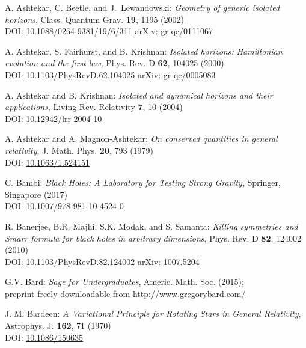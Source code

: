\begin{thebibliography}{123}
A. Ashtekar, C. Beetle, and J.~Lewandowski:
{\em Geometry of generic isolated horizons},
Class. Quantum Grav. {\bf 19}, 1195 (2002)\\
DOI: \href{https://doi.org/10.1088/0264-9381/19/6/311}{10.1088/0264-9381/19/6/311}\hfill
arXiv: \href{https://arxiv.org/abs/gr-qc/0111067}{gr-qc/0111067}

A. Ashtekar, S. Fairhurst, and B. Krishnan:
{\em Isolated horizons: Hamiltonian evolution and the first law},
Phys. Rev. D {\bf 62}, 104025 (2000)\\
DOI: \href{https://doi.org/10.1103/PhysRevD.62.104025}{10.1103/PhysRevD.62.104025}\hfill
arXiv: \href{https://arxiv.org/abs/gr-qc/0005083}{gr-qc/0005083}

A. Ashtekar and B. Krishnan: {\em Isolated and dynamical horizons
and their applications},
Living Rev. Relativity {\bf 7}, 10 (2004)\\
DOI: \href{https://doi.org/10.12942/lrr-2004-10}{10.12942/lrr-2004-10}

A. Ashtekar and A. Magnon-Ashtekar:
{\em On conserved quantities in general relativity},
J. Math. Phys. {\bf 20}, 793 (1979)\\
DOI: \href{https://doi.org/10.1063/1.524151}{10.1063/1.524151}

C. Bambi: {\em Black Holes: A Laboratory for Testing Strong Gravity},
Springer, Singapore (2017)\\
DOI: \href{https://doi.org/10.1007/978-981-10-4524-0}{10.1007/978-981-10-4524-0}

R. Banerjee, B.R. Majhi, S.K. Modak, and S. Samanta:
{\em Killing symmetries and Smarr formula for black holes in arbitrary dimensions},
Phys. Rev. D {\bf 82}, 124002 (2010)\\
DOI: \href{https://doi.org/10.1103/PhysRevD.82.124002}{10.1103/PhysRevD.82.124002}\hfill
arXiv: \href{https://arxiv.org/abs/1007.5204}{1007.5204}

G.V. Bard: {\em Sage for Undergraduates}, Americ. Math. Soc. (2015); \\
preprint freely downloadable from \url{http://www.gregorybard.com/}

J. M. Bardeen: {\em A Variational Principle for Rotating Stars in General Relativity},
Astrophys. J. {\bf  162}, 71 (1970)\\
DOI: \href{https://doi.org/10.1086/150635}{10.1086/150635}


\end{thebibliography}
